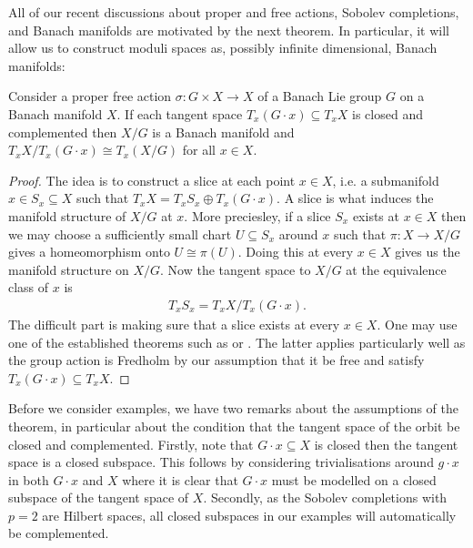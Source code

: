 \documentclass[12pt]{ociamthesis}  %
\begin{document}
All of our recent discussions about proper and free actions, Sobolev
completions, and Banach manifolds are motivated by the next theorem.
In particular, it will allow us to construct moduli spaces as, possibly
infinite dimensional, Banach manifolds:

\begin{theorem}\label{thm:banach_quotient}
  Consider a proper free action $\sigma : G\times X\to X$ of a Banach
  Lie group $G$ on a Banach manifold $X$. If each tangent space
  $T_x(G\cdot x) \subseteq T_x X$ is closed and complemented then
  $X/G$ is a Banach manifold and $T_x X/T_x (G\cdot x) \cong T_x(X/G)$
  for all $x\in X$.
  \begin{proof}
    The idea is to construct a slice at each point $x\in X$, i.e. a submanifold
    $x\in S_x\subseteq X$ such that $T_x X = T_xS_x \oplus T_x(G\cdot x)$. A slice is
    what induces the manifold structure of $X/G$ at $x$. More preciesley, if a slice
    $S_x$ exists at $x\in X$ then we may choose a sufficiently small chart $U\subseteq S_x$
    around $x$ such that $\pi : X \to X/G$ gives a homeomorphism onto $U\cong\pi(U)$. Doing this
    at every $x\in X$ gives us the manifold structure on $X/G$. Now the tangent space
    to $X/G$ at the equivalence class of $x$ is
    \begin{align}\label{eq:banach_quotient_tangent}
      T_x S_x = T_x X / T_x (G\cdot x).
    \end{align}
    The difficult part is making sure that a slice exists at every $x\in X$. One may use
    one of the established theorems such as \cite[Theorem 3.28]{diez2019}
    or \cite[Theorem 5.2.6]{palais1992}. The latter applies particularly well
    as the group action is Fredholm by our assumption that it be free and satisfy
    $T_x(G\cdot x)\subseteq T_x X$.
  \end{proof}
\end{theorem}

Before we consider examples, we have two remarks about the assumptions of the theorem,
in particular about the condition that the tangent space of the orbit be closed and
complemented. Firstly, note that $G\cdot x \subseteq X$ is closed then the tangent
space is a closed subspace. This follows by considering trivialisations around $g\cdot x$
in both $G\cdot x$ and $X$ where it is clear that $G\cdot x$ must be modelled on a closed
subspace of the tangent space of $X$. Secondly, as the Sobolev completions with $p=2$ are
Hilbert spaces, all closed subspaces in our examples will automatically be complemented.
\end{document}
